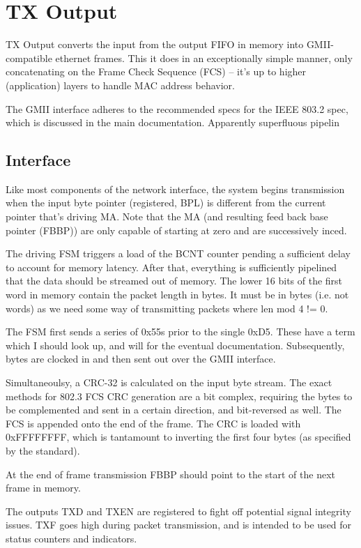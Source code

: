 
\section{TX Output}

TX Output converts the input from the output FIFO in memory into
GMII-compatible ethernet frames. This it does in an exceptionally
simple manner, only concatenating on the Frame Check Sequence (FCS) --
it's up to higher (application) layers to handle MAC address behavior.

The GMII interface adheres to the recommended specs for the IEEE 803.2
spec, which is discussed in the main documentation. Apparently
superfluous pipelin

\subsection{Interface}
Like most components of the network interface, the system begins
transmission when the input byte pointer (registered, BPL) is
different from the current pointer that's driving MA. Note that the MA
(and resulting feed back base pointer (FBBP)) are only capable of
starting at zero and are successively inced.

The driving FSM triggers a load of the BCNT counter pending a
sufficient delay to account for memory latency. After that, everything
is sufficiently pipelined that the data should be streamed out of
memory. The lower 16 bits of the first word in memory contain the
packet length in bytes. It must be in bytes (i.e. not words) as we
need some way of transmitting packets where len mod 4 != 0.

The FSM first sends a series of 0x55s prior to the single 0xD5. These have a term which I should look up, and will for the eventual documentation. Subsequently, bytes are clocked in and then sent out over the GMII interface. 

Simultaneoulsy, a CRC-32 is calculated on the input byte stream. The
exact methods for 802.3 FCS CRC generation are a bit complex,
requiring the bytes to be complemented and sent in a certain
direction, and bit-reversed as well. The FCS is appended onto the end
of the frame. The CRC is loaded with 0xFFFFFFFF, which is tantamount
to inverting the first four bytes (as specified by the standard).

At the end of frame transmission FBBP should point to the start of the next frame in memory. 

The outputs TXD and TXEN are registered to fight off potential signal
integrity issues. TXF goes high during packet transmission, and is
intended to be used for status counters and indicators.
